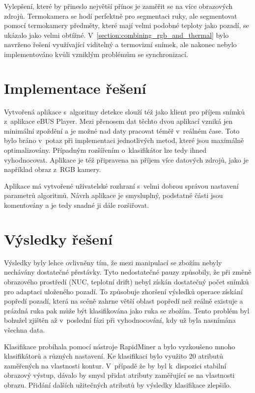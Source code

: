 Vylepšení, které by přineslo největší přínos je zaměřit se na více obrazových zdrojů. Termokamera se hodí perfektně pro segmentaci ruky, ale segmentovat pomocí termokamery předměty, které mají velmi podobné teploty jako pozadí, se ukázalo jako velmi obtížné. V~\ref{section:combining_rgb_and_thermal} bylo navrženo řešení využívající viditelný a termovizní snímek, ale nakonec nebylo implementováno kvůli vzniklým problémům se synchronizací.

\section{Implementace řešení}
Vytvořená aplikace s~algoritmy detekce slouží též jako klient pro příjem snímků z~aplikace eBUS Player. Mezi přenosem dat těchto dvou aplikací vzniká jen minimální zpoždění a je možné nad daty pracovat téměř v~reálném čase. Toto bylo bráno v~potaz při implementaci jednotlivých metod, které jsou maximálně optimalizovány. Případným rozšířením o~klasifikátor lze tedy ihned vyhodnocovat. Aplikace je též připravena na příjem více datových zdrojů, jako je například obraz z~RGB kamery.

Aplikace má vytvořené uživatelské rozhraní s~velmi dobrou správou nastavení parametrů algoritmů. Návrh aplikace je smysluplný, podstatné části jsou komentovány a je tedy snadné ji dále rozšiřovat.

\section{Výsledky řešení}
Výsledky byly lehce ovlivněny tím, že mezi manipulací se zbožím nebyly nechávány dostatečné přestávky. Tyto nedostatečné pauzy způsobily, že při změně obrazového prostředí (NUC, teplotní drift) nebyl získán dostatečný počet snímků pro adaptaci uloženého pozadí. To způsobuje zhoršení výsledků operace získání popředí pozadí, která na scéně zahrne větší oblast popředí než reálně existuje a prázdná ruka pak může být klasifikována jako ruka se zbožím. Tento problém byl bohužel zjištěn až v~poslední fázi při vyhodnocování, kdy už byla nasnímána všechna data.

Klasifikace probíhala pomocí nástroje RapidMiner a bylo vyzkoušeno mnoho klasifikátorů a různých nastavení. Ke klasifikaci bylo využito 20 atributů zaměřených na vlastnosti kontur. V~případě že by byl k~dispozici stabilní obrazový výstup, dávalo by smysl přidat atributy zaměřující se na vlastnosti obrazu. Přidání dalších užitečných atributů by výsledky klasifikace zlepšilo. 

